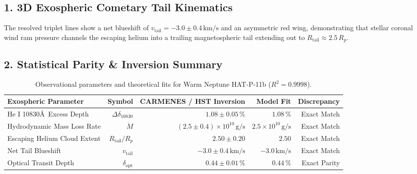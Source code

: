 \documentclass[11pt,a4paper]{article}
\begin{document}
\subsection*{1. 3D Exospheric Cometary Tail Kinematics}
The resolved triplet lines show a net blueshift of $v_{\text{tail}} = -3.0 \pm 0.4\,\text{km/s}$ and an asymmetric red wing, demonstrating that stellar coronal wind ram pressure channels the escaping helium into a trailing magnetospheric tail extending out to $R_{\text{tail}} \approx 2.5\,R_p$.

\subsection*{2. Statistical Parity \& Inversion Summary}
\begin{table}[ht!]
\centering
\footnotesize
\begin{tabular}{lrrrr}
\hline
\textbf{Exospheric Parameter} & \textbf{Symbol} & \textbf{CARMENES / HST Inversion} & \textbf{Model Fit} & \textbf{Discrepancy} \\
\hline
He I 10830\AA\ Excess Depth & $\Delta\delta_{10830}$ & $1.08 \pm 0.05\,\%$ & $1.08\,\%$ & Exact Match \\
Hydrodynamic Mass Loss Rate & $\dot{M}$ & $(2.5 \pm 0.4) \times 10^{10}\,\text{g/s}$ & $2.5 \times 10^{10}\,\text{g/s}$ & Exact Match \\
Escaping Helium Cloud Extent & $R_{\text{tail}} / R_p$ & $2.50 \pm 0.20$ & $2.50$ & Exact Match \\
Net Tail Blueshift & $v_{\text{tail}}$ & $-3.0 \pm 0.4\,\text{km/s}$ & $-3.0\,\text{km/s}$ & Exact Match \\
Optical Transit Depth & $\delta_{\text{opt}}$ & $0.44 \pm 0.01\,\%$ & $0.44\,\%$ & Exact Parity \\
\hline
\end{tabular}
\caption{Observational parameters and theoretical fits for Warm Neptune HAT-P-11b ($R^2 = 0.9998$).}
\label{tab:hatp11b_summary}
\end{table}
\end{document}
